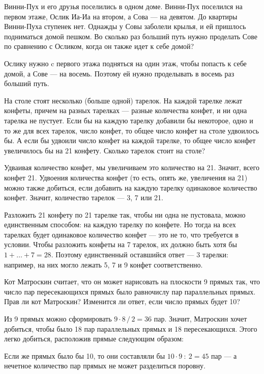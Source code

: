 ﻿


\begin{itemize}

	\itA Винни-Пух и его друзья поселились в одном доме. Винни-Пух поселился на первом этаже, Ослик Иа-Иа на втором, а Сова — на девятом. До квартиры Винни-Пуха ступенек нет. Однажды у Совы заболели крылья, и ей пришлось подниматься домой пешком. Во сколько раз больший путь нужно проделать Сове по сравнению с Осликом, когда он также идет к себе домой?
	
	\itr Ослику нужно c первого этажа подняться на один этаж, чтобы попасть к себе домой, а Сове — на восемь. Поэтому ей нужно проделывать в восемь раз больший путь.

	\itB На столе стоят несколько (больше одной) тарелок. На каждой тарелке лежат конфеты, причем на разных тарелках — разные количества конфет, и ни одна тарелка не пустует. Если бы на каждую тарелку добавили бы некоторое, одно и то же для всех тарелок, число конфет, то общее число конфет на столе удвоилось бы. А если бы удвоили число конфет на каждой тарелке, то общее число конфет увеличилось бы на 21 конфету. Сколько тарелок стоит на столе?
	
	\itr Удваивая количество конфет, мы увеличиваем это количество на 21. Значит, всего конфет 21. Удвоения количества конфет (то есть, опять же, увеличения на 21) можно также добиться, если добавить на каждую тарелку одинаковое количество конфет. Значит, количество тарелок — 3, 7 или 21.
	
	Разложить 21 конфету по 21 тарелке так, чтобы ни одна не пустовала, можно единственным способом: на каждую тарелку по конфете. Но тогда на всех тарелках будет одинаковое количество конфет — это не то, что требуется в условии. Чтобы разложить конфеты на 7 тарелок, их должно быть хотя бы $1 + \ldots + 7 = 28$. Поэтому единственный оставшийся ответ — 3 тарелки: например, на них могло лежать 5, 7 и 9 конфет соответственно.

	\itC Кот Матроскин считает, что он может нарисовать на плоскости 9 прямых так, что число пар пересекающихся прямых было равно\linebreak числу пар параллельных прямых. Прав ли кот Матроскин? Изменится ли ответ, если число прямых будет 10?

	\itr Из 9 прямых можно сформировать $9 \cdot 8\,/\,2 = 36$ пар. Значит, Матроскин хочет добиться, чтобы было 18 пар параллельных прямых и 18 пересекающихся. Этого легко добиться, расположив прямые следующим образом:
	
	\begin{center}  \end{center}
	
	Если же прямых было бы 10, то они составляли бы $10 \cdot 9\ :\ 2 = 45$ пар — а нечетное количество пар прямых не может разделиться поровну.

\end{itemize}

